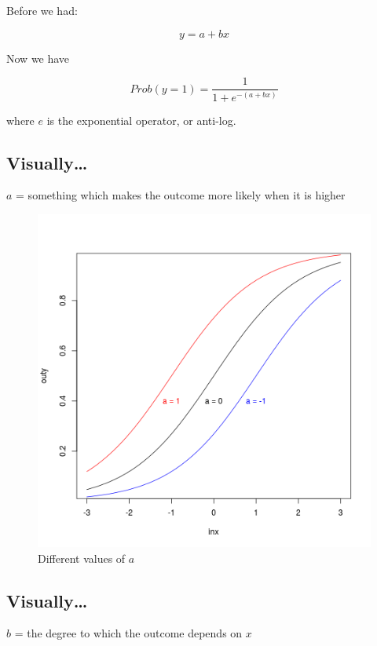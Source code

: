 \documentclass[12pt,twoside]{article}
\begin{document}
Before we had:

\[
y = a + bx
\]

Now we have

\[
Prob(y = 1) = \frac{1}{1 + e^{-(a+bx)}}
\]

where \(e\) is the exponential operator, or anti-log.

\subsection{Visually\ldots{}}\label{visually}

\(a\) = something which makes the outcome more likely when it is higher

\begin{figure}[htbp]
\centering
\includegraphics{figure/logitplots1-1.png}
\caption{Different values of \(a\)}
\end{figure}

\subsection{Visually\ldots{}}\label{visually-1}

\(b\) = the degree to which the outcome depends on \(x\)
\end{document}

